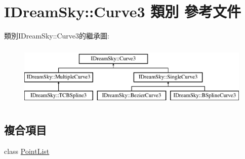\hypertarget{class_i_dream_sky_1_1_curve3}{}\section{I\+Dream\+Sky\+:\+:Curve3 類別 參考文件}
\label{class_i_dream_sky_1_1_curve3}
類別\+I\+Dream\+Sky\+:\+:Curve3的繼承圖\+:\begin{figure}[H]
\begin{center}
\leavevmode
\includegraphics[height=3.000000cm]{class_i_dream_sky_1_1_curve3}
\end{center}
\end{figure}
\subsection*{複合項目}
\begin{DoxyCompactItemize}
\item 
class \hyperlink{class_i_dream_sky_1_1_curve3_1_1_point_list}{Point\+List}
\end{DoxyCompactItemize}
